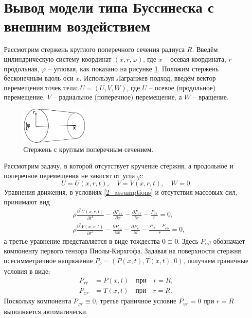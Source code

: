 \documentclass[12pt, a4paper]{article}
\newcommand{\vect}[1]{\underline{#1}}
\begin{document}
\section{Вывод модели типа Буссинеска с внешним воздействием}

Рассмотрим стержень круглого поперечного сечения радиуса $R$. Введём цилиндрическую систему координат $(x, r, \varphi)$, где $x$ -- осевая координата, $r$ -- продольная, $\varphi$ -- угловая, как показано на рисунке \ref{fig:rod}. Положим стержень бесконечным вдоль оси $x$. Используя Лагранжев подход, введём вектор перемещения точек тела: $\vect{U} = (U, V, W)$, где $U$ -- осевое (продольное) перемещение, $V$ -- радиальное (поперечное) перемещение, а $W$ -- вращение.
\begin{figure}[h]
	\centering
	\includegraphics[width=0.3\textwidth]{1_RodSchematic}
	\caption{Стержень с круглым поперечным сечением.}
	\label{fig:rod}
\end{figure}

Рассмотрим задачу, в которой отсутствует кручение стержня, а продольное и поперечное перемещения не зависят от угла $\varphi$:
\begin{equation}\label{2_assumptions}
U = U(x,r,t), \quad V = V(x,r,t), \quad W = 0.
\end{equation}
Уравнения движения, в условиях \eqref{2_assumptions} и отсутствия массовых сил, принимают вид
\begin{align}
\label{2_eq1_0}
&\rho  \frac{\partial^2 U(x,r,t)}{\partial t^2}-\frac{\partial P_{x x}}{\partial x}-\frac{\partial P_{xr}}{\partial r}-\frac{P_{xr}}{r} = 0,\\
\label{2_eq2_0}
&\rho  \frac{\partial^2 V(x,r,t)}{\partial t^2} - \frac{\partial P_{rx}}{\partial x}-\frac{\partial P_{rr}}{\partial r}-\frac{P_{rr} - P_{\varphi\varphi}}{r} = 0,
\end{align}
а третье уравнение представляется в виде тождества $0\equiv 0$. Здесь $P_{\alpha \beta}$ обозначает компоненту первого тензора Пиолы-Кирхгофа. Задавая на поверхности стержня осесимметричное напряжение $\vect{P_b} = (P(x,t), T(x,t), 0)$, получаем граничные условия в виде:
\begin{align}
P_{rr} &= P(x, t) \quad \mbox{при} \quad r = R \label{2_bc_rr},\\
P_{xr} &= T(x, t) \quad \mbox{при} \quad r = R \label{2_bc_rx}.
\end{align}
Поскольку компонента $ P_{\varphi r} \equiv 0 $, третье граничное условие $P_{\varphi r} = 0$ при $r = R$ выполняется автоматически.
\end{document}
